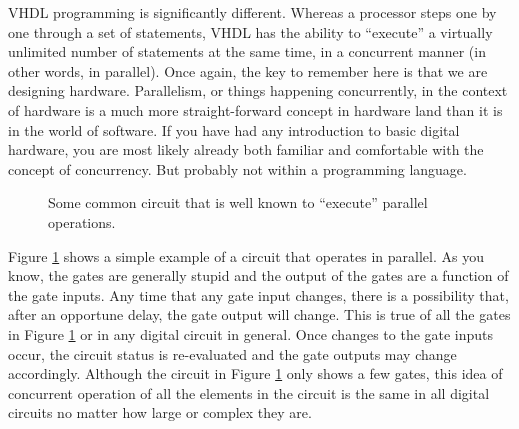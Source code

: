 VHDL programming is significantly different. Whereas a processor steps one by one through a set of statements, VHDL has the ability to ``execute'' a virtually unlimited number of statements at the same time, in a concurrent manner (in other words, in parallel). Once again, the key to remember here is that we are designing hardware. Parallelism, or things happening concurrently, in the context of hardware is a much more straight-forward concept in hardware land than it is in the world of software. If you have had any introduction to basic digital hardware, you are most likely already both familiar and comfortable with the concept of concurrency. But probably not within a programming language.

\begin{figure}
\centering
\usetikzlibrary{er}
\caption{Some common circuit that is well known to ``execute'' parallel operations.}
\label{concurrent_circuit}
\end{figure}

Figure \ref{concurrent_circuit} shows a simple example of a circuit that operates in parallel. As you know, the gates are generally stupid and the output of the gates are a function of the gate inputs. Any time that any gate input changes, there is a possibility that, after an opportune delay, the gate output will change. This is true of all the gates in Figure \ref{concurrent_circuit} or in any digital circuit in general. Once changes to the gate inputs occur, the circuit status is re-evaluated and the gate outputs may change accordingly. Although the circuit in Figure \ref{concurrent_circuit} only shows a few gates, this idea of concurrent operation of all the elements in the circuit is the same in all digital circuits no matter how large or complex they are.

